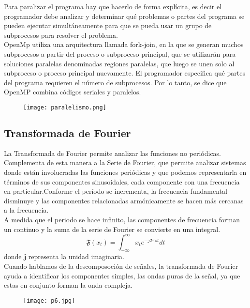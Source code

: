 \documentclass{article}
\begin{document}
Para paralizar el programa hay que hacerlo de forma explícita, es decir el programador debe analizar y determinar qué problemas o partes del programa se pueden ejecutar simultáneamente para que se pueda usar un grupo de subprocesos para resolver el problema. \\

OpenMp utiliza una arquitectura llamada fork-join, en la que se generan muchos subprocesos a partir del proceso o subproceso principal, que se utilizarán para soluciones paralelas denominadas regiones paralelas, que luego se unen solo al subproceso o proceso principal nuevamente. El programador especifica qué partes del programa requieren el número de subprocesos. Por lo tanto, se dice que OpenMP combina códigos seriales y paralelos.\\

\begin{figure}[h]
\centering
\texttt{[image: paralelismo.png]}
\end{figure}

\subsection{Transformada de Fourier}

La Transformada de Fourier permite analizar las funciones no periódicas. Complementa de esta manera a la Serie de Fourier, que permite analizar sistemas donde están involucradas las funciones periódicas y que podemos representarla en términos de sus componentes sinusoidales, cada componente con una frecuencia en particular.Conforme el período se incrementa, la frecuencia fundamental disminuye y las componentes relacionadas armónicamente se hacen más cercanas a la frecuencia.\\

A medida que el periodo se hace infinito, las componentes de frecuencia forman un continuo y la suma de la serie de Fourier se convierte en una integral.
$$
\mathfrak{F}(x_{t})=\int_{-\infty }^{\infty}x_{t}e^{-j2\pi st}dt
$$
donde \textbf{j} representa la unidad imaginaria.\\

Cuando hablamos de la descomposoción de señales, la transformada de Fourier ayuda a identificar los componentes simples, las ondas puras de la señal, ya que estas en conjunto forman la onda compleja.

\begin{figure}[h]
\texttt{[image: p6.jpg]}
\end{figure}
\end{document}
